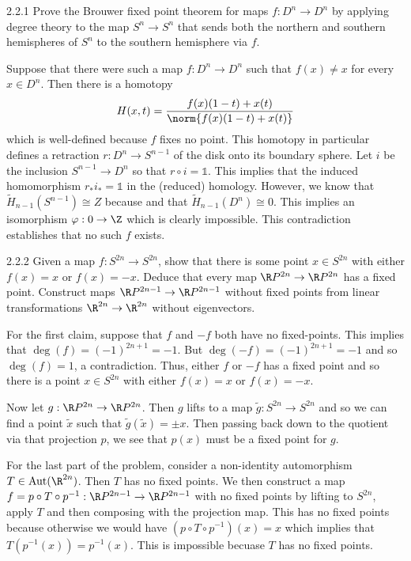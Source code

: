 \documentclass{article}
\begin{document}
\begin{exercise}{2.2.1}{\parindent}
  Prove the Brouwer fixed point theorem for maps $f: D^n \to D^n$ by
  applying degree theory to the map $S^n \to S^n$ that sends both the
  northern and southern hemispheres of $S^n$ to the southern
  hemisphere via $f$.
\end{exercise}
\begin{solution}{\parindent}
  Suppose that there were such a map $f: D^n \to D^n$ such that $f(x)
  \neq x$ for every $x \in D^n$. Then there is a homotopy
  \[
  H(x,t) = \frac{f(x)(1-t) + x(t)}{\norm{f(x)(1-t) + x(t)}}
  \]
  which is well-defined because $f$ fixes no point. This homotopy in
  particular defines a retraction $r: D^n \to S^{n-1}$ of the disk
  onto its boundary sphere. Let $i$ be the inclusion $S^{n-1}\to D^n$
  so that $r\circ i = \mathbb{1}$. This implies that the induced
  homomorphism $r_\ast i_\ast = \mathbb{1}$ in the (reduced)
  homology. However, we know that $\tilde{H}_{n-1}(S^{n-1}) \cong Z$
  because and that $\tilde{H}_{n-1}(D^n) \cong 0$. This implies an
  isomorphism $\varphi: 0 \to \Z$ which is clearly impossible. This
  contradiction establishes that no such $f$ exists.
\end{solution}

\begin{exercise}{2.2.2}{\parindent}
  Given a map $f:S^{2n} \to S^{2n}$, show that there is some point $x
  \in S^{2n}$ with either $f(x) = x$ or $f(x) = -x$. Deduce that every
  map $\R P^{2n} \to \R P^{2n}$ has a fixed point. Construct maps $\R
  P^{2n-1} \to \R P^{2n-1}$ without fixed points from linear
  transformations $\R^{2n} \to \R^{2n}$ without eigenvectors.
\end{exercise}
\begin{solution}{\parindent}
  For the first claim, suppose that $f$ and $-f$ both have no
  fixed-points. This implies that $\deg(f) = (-1)^{2n+1} = -1$. But
  $\deg(-f) = (-1)^{2n+1} = -1$ and so $\deg(f) = 1$, a
  contradiction. Thus, either $f$ or $-f$ has a fixed point and so
  there is a point $x \in S^{2n}$ with either $f(x) = x$ or $f(x) =
  -x$.

  Now let $g: \R P^{2n} \to \R P^{2n}$. Then $g$ lifts to a map
  $\tilde{g}: S^{2n} \to S^{2n}$ and so we can find a point
  $\tilde{x}$ such that $\tilde{g}(\tilde{x}) = \pm x$. Then passing
  back down to the quotient via that projection $p$, we see that
  $p(x)$ must be a fixed point for $g$.

  For the last part of the problem, consider a non-identity
  automorphism $T \in \text{Aut}(\R^{2n})$. Then $T$ has no fixed
  points. We then construct a map $f = p \circ T \circ p^{-1}: \R
  P^{2n-1} \to \R P^{2n-1}$ with no fixed points by lifting to
  $S^{2n}$, apply $T$ and then composing with the projection map. This
  has no fixed points because otherwise we would have $(p \circ T
  \circ p^{-1})(x) = x$ which implies that $T(p^{-1}(x)) =
  p^{-1}(x)$. This is impossible becuase $T$ has no fixed points.
\end{solution}
\end{document}
